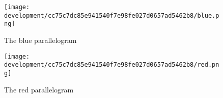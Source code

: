 \documentclass[../development.tex]{subfiles}
\begin{document}
\begin{figure}[H]
\begin{minipage}{0.48\linewidth}
	\centering
	\texttt{[image: development/cc75c7dc85e941540f7e98fe027d0657ad5462b8/blue.png]}
	\caption{The blue parallelogram}
	\label{fig:development:cc75c7dc85e941540f7e98fe027d0657ad5462b8:blue.png}
\end{minipage}\hfill
\begin{minipage}{0.48\linewidth}
	\centering
	\texttt{[image: development/cc75c7dc85e941540f7e98fe027d0657ad5462b8/red.png]}
	\caption{The red parallelogram}
	\label{fig:development:cc75c7dc85e941540f7e98fe027d0657ad5462b8:red.png}
\end{minipage}
\vspace{-1em}
\end{figure}
\end{document}
